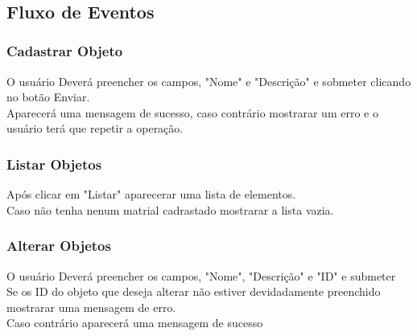 \documentclass[a4paper]{article}
\begin{document}
    \\


 \subsection{Fluxo de Eventos}
    \subsubsection{Cadastrar Objeto}
      O usuário Deverá preencher os campos, "Nome" e "Descrição" e sobmeter clicando no botão Enviar.\\
      Aparecerá uma mensagem de sucesso, caso contrário mostrarar um erro e o usuário terá que repetir a operação.\\

      \subsubsection{Listar Objetos}
    Após clicar em "Listar" aparecerar uma lista de elementos.\\
    Caso não tenha nenum matrial cadrastado mostrarar a lista vazia.\\
    
    \subsubsection{Alterar Objetos}
    O usuário Deverá preencher os campos, "Nome", "Descrição" e "ID" e submeter\\
    Se os ID do objeto que deseja alterar não estiver devidadamente preenchido mostrarar uma mensagem de erro.\\
    Caso contrário aparecerá uma mensagem de sucesso\\
\end{document}
